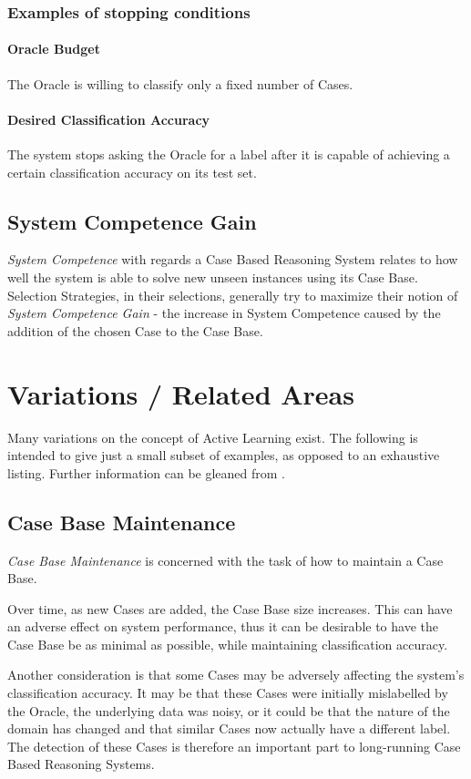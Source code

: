 \documentclass[a4paper,11pt]{report}
\begin{document}
\subsubsection{Examples of stopping conditions}
\paragraph{Oracle Budget} 
The Oracle is willing to classify only a fixed number of Cases.

\paragraph{Desired Classification Accuracy} 
The system stops asking the Oracle for a label after it is capable of achieving a certain classification accuracy on its test set.

\subsection{System Competence Gain}
\emph{System Competence} with regards a Case Based Reasoning System relates to how well the system is able to solve new unseen instances using its Case Base. Selection Strategies, in their selections, generally try to maximize their notion of \emph{System Competence Gain} - the increase in System Competence caused by the addition of the chosen Case to the Case Base.

\section{Variations / Related Areas}
Many variations on the concept of Active Learning exist. The following is intended to give just a small subset of examples, as opposed to an exhaustive listing. Further information can be gleaned from \citet{Settles2010}.

\subsection{Case Base Maintenance}
\emph{Case Base Maintenance} is concerned with the task of how to maintain a Case Base. 

Over time, as new Cases are added, the Case Base size increases. This can have an adverse effect on system performance, thus it can be desirable to have the Case Base be as minimal as possible, while maintaining classification accuracy.

Another consideration is that some Cases may be adversely affecting the system's classification accuracy. It may be that these Cases were initially mislabelled by the Oracle, the underlying data was noisy, or it could be that the nature of the domain has changed and that similar Cases now actually have a different label. The detection of these Cases is therefore an important part to long-running Case Based Reasoning Systems.
\end{document}
